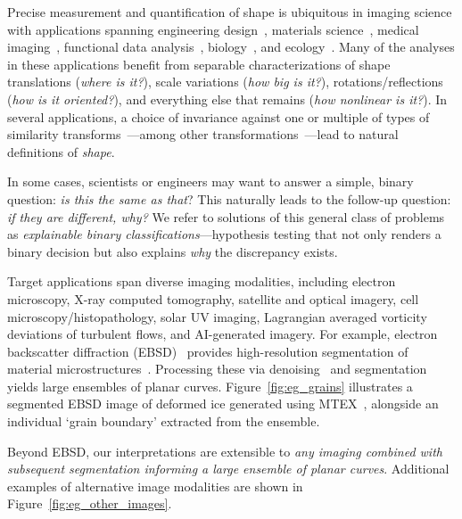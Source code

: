 \documentclass[pdflatex,iicol]{sn-jnl}%
\theoremstyle{thmstyleone}%
\theoremstyle{thmstyletwo}%
\theoremstyle{thmstylethree}%
\begin{document}
Precise measurement and quantification of shape is ubiquitous in imaging science with applications spanning engineering design~\cite{Grey2017,Doronina2023}, materials science~\cite{atindama2023restoration,bachmann2010inferential,Fan2020,FAN2021116810}, medical imaging~\cite{mang2019claire,durrleman2014morphometry}, functional data analysis~\cite{tucker2013generative, srivastava2016functional}, biology~\cite{hartman2023elastic,srivastava2010shape,hagwood2013testing}, and ecology~\cite{lynch2023satellite,gonccalves2021fine}. Many of the analyses in these applications benefit from separable characterizations of shape translations (\emph{where is it?}), scale variations (\emph{how big is it?}), rotations/reflections (\emph{how is it oriented?}), and everything else that remains (\emph{how nonlinear is it?}). In several applications, a choice of invariance against one or multiple of types of similarity transforms~\cite{kendall2009shape}---among other transformations~\cite{bauer2014overview}---lead to natural definitions of \emph{shape}. 

In some cases, scientists or engineers may want to answer a simple, binary question: \emph{is this the same as that}? This naturally leads to the follow-up question: \emph{if they are different, why?} We refer to solutions of this general class of problems as \emph{explainable binary classifications}---hypothesis testing that not only renders a binary decision but also explains \emph{why} the discrepancy exists.

Target applications span diverse imaging modalities, including electron microscopy, X-ray computed tomography, satellite and optical imagery, cell microscopy/histopathology, solar UV imaging, Lagrangian averaged vorticity deviations of turbulent flows, and AI-generated imagery. For example, electron backscatter diffraction (EBSD)~\cite{schwartz2009electron} provides high-resolution segmentation of material microstructures~\cite{SAVILLE2021102118,stoudt2020location}. Processing these via denoising~\cite{atindama2023restoration} and segmentation~\cite{bachmann2010texture,FAN2021116810} yields large ensembles of planar curves. Figure~\ref{fig:eg_grains} illustrates a segmented EBSD image of deformed ice generated using MTEX~\cite{Hielscher:cg5083,Fan2020,FAN2021116810}, alongside an individual `grain boundary' extracted from the ensemble.

Beyond EBSD, our interpretations are extensible to \textit{any imaging combined with subsequent segmentation informing a large ensemble of planar curves}. Additional examples of alternative image modalities are shown in Figure~\ref{fig:eg_other_images}.
\end{document}
